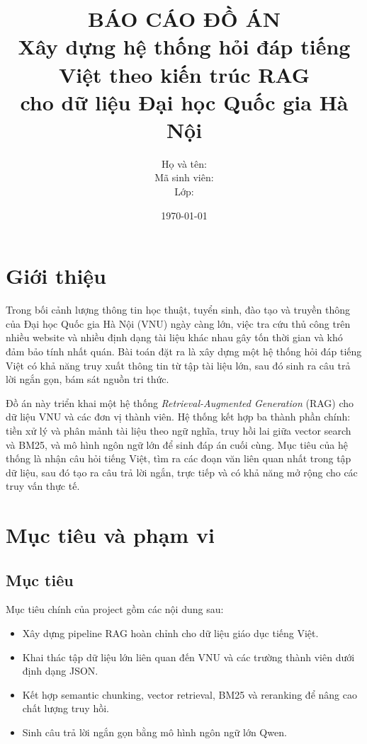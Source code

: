 \documentclass[12pt,a4paper]{article}
\title{\textbf{BÁO CÁO ĐỒ ÁN}\\
Xây dựng hệ thống hỏi đáp tiếng Việt theo kiến trúc RAG\\
cho dữ liệu Đại học Quốc gia Hà Nội}
\author{
    Họ và tên: \dotfill \\
    Mã sinh viên: \dotfill \\
    Lớp: \dotfill
}
\date{\today}
\begin{document}
\maketitle
\tableofcontents
\newpage

\section{Giới thiệu}

Trong bối cảnh lượng thông tin học thuật, tuyển sinh, đào tạo và truyền thông của Đại học Quốc gia Hà Nội (VNU) ngày càng lớn, việc tra cứu thủ công trên nhiều website và nhiều định dạng tài liệu khác nhau gây tốn thời gian và khó đảm bảo tính nhất quán. Bài toán đặt ra là xây dựng một hệ thống hỏi đáp tiếng Việt có khả năng truy xuất thông tin từ tập tài liệu lớn, sau đó sinh ra câu trả lời ngắn gọn, bám sát nguồn tri thức.

Đồ án này triển khai một hệ thống \textit{Retrieval-Augmented Generation} (RAG) cho dữ liệu VNU và các đơn vị thành viên. Hệ thống kết hợp ba thành phần chính: tiền xử lý và phân mảnh tài liệu theo ngữ nghĩa, truy hồi lai giữa vector search và BM25, và mô hình ngôn ngữ lớn để sinh đáp án cuối cùng. Mục tiêu của hệ thống là nhận câu hỏi tiếng Việt, tìm ra các đoạn văn liên quan nhất trong tập dữ liệu, sau đó tạo ra câu trả lời ngắn, trực tiếp và có khả năng mở rộng cho các truy vấn thực tế.

\section{Mục tiêu và phạm vi}

\subsection{Mục tiêu}

Mục tiêu chính của project gồm các nội dung sau:
\begin{itemize}[leftmargin=1.5cm]
    \item Xây dựng pipeline RAG hoàn chỉnh cho dữ liệu giáo dục tiếng Việt.
    \item Khai thác tập dữ liệu lớn liên quan đến VNU và các trường thành viên dưới định dạng JSON.
    \item Kết hợp semantic chunking, vector retrieval, BM25 và reranking để nâng cao chất lượng truy hồi.
    \item Sinh câu trả lời ngắn gọn bằng mô hình ngôn ngữ lớn Qwen.
\end{itemize}
\end{document}
